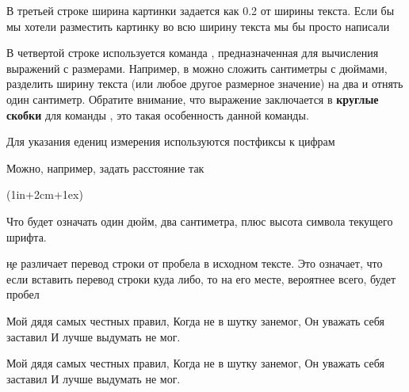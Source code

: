 {{{{В третьей строке ширина картинки задается как 0.2 от ширины текста. Если бы мы
хотели разместить картинку во всю ширину текста мы бы просто
написали 

В четвертой строке используется команда , предназначенная для
вычисления выражений с размерами. Например, в  можно сложить
сантиметры с дюймами, разделить ширину текста (или любое другое размерное
значение) на два и отнять один сантиметр. Обратите внимание, что выражение
заключается в {\bf круглые скобки} для команды , это такая
особенность данной команды.

Для указания едениц измерения используются постфиксы к цифрам


Можно, например, задать расстояние так

\startTEX
\dimexpr(1in+2cm+1ex)
\stopTEX

Что будет означать один дюйм, два сантиметра, плюс высота символа 
текущего шрифта.

\subject{Перенос строки}

\c  не различает перевод строки от пробела в исходном тексте. Это означает, что если
вставить перевод строки куда либо, то на его месте, вероятнее всего, будет пробел

\vbox{
 \hfill
\startTEX
Мой дядя самых честных правил,
Когда не в шутку занемог,
Он уважать себя заставил
И лучше выдумать не мог.
\stopTEX
\stopdescr
}

\vbox{
 \hfill
\startCODERESULT
Мой дядя самых честных правил,
Когда не в шутку занемог,
Он уважать себя заставил
И лучше выдумать не мог.
\stopCODERESULT
\stopdescr
}

}}}}

